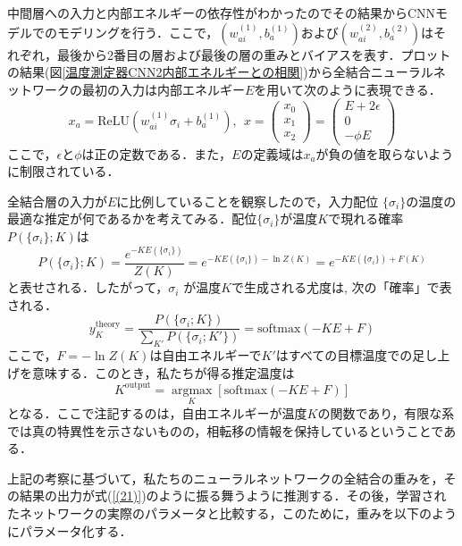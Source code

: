 \documentclass[a4paper,11pt]{jsreport}
\begin{document}
中間層への入力と内部エネルギーの依存性がわかったのでその結果からCNNモデルでのモデリングを行う．ここで，$(w_{ai}^{(1)}, b_a^{(1)})$および$(w_{ai}^{(2)}, b_a^{(2)})$はそれぞれ，最後から2番目の層および最後の層の重みとバイアスを表す．プロットの結果(図\ref{温度測定器CNN2内部エネルギーとの相関})から全結合ニューラルネットワークの最初の入力は内部エネルギー$E$を用いて次のように表現できる．
\begin{equation}
  x_a = \text{ReLU}(w_{ai}^{(1)}\sigma_i + b_a^{(1)}), \ \
  x = \begin{pmatrix} x_0 \\ x_1 \\ x_2 \end{pmatrix}
  = \begin{pmatrix} E+2\epsilon \\ 0 \\ -\phi E \end{pmatrix}
  \label{(19)}
\end{equation}
ここで，$\epsilon$と$\phi$は正の定数である．また，$E$の定義域は$x_a$が負の値を取らないように制限されている．\par
全結合層の入力が$E$に比例していることを観察したので，入力配位 $\{\sigma_i\}$の温度の最適な推定が何であるかを考えてみる．配位$\{ \sigma_i \}$が温度$K$で現れる確率$P(\{ \sigma_i \} ; K )$は
\begin{equation}
  P(\{ \sigma_i \} ; K )
  = \frac{e^{-KE(\{ \sigma_i \})}}{Z(K)}
  = e^{-KE(\{ \sigma_i \}) - \ln{Z(K)}}
  = e^{-KE(\{ \sigma_i \}) + F(K)}
\end{equation}
と表せされる．したがって，${\sigma_i}$ が温度$K$で生成される尤度は,
次の「確率」で表される．
\begin{equation}
  y_K^{\text{theory}} = \frac{P(\{\sigma_i ; K \})}{\sum_{K'}P(\{\sigma_i ; K' \})} = \text{softmax}(-KE + F) \label{(21)}
\end{equation}
ここで，$F = -\ln{Z(K)}$は自由エネルギーで$K'$はすべての目標温度での足し上げを意味する．このとき，私たちが得る推定温度は
\begin{equation}
  K^{\text{output}} =
  \underset{K} {\operatorname{argmax}} \left[\text{softmax}(-KE + F)\right]
\end{equation}
となる．ここで注記するのは，自由エネルギーが温度$K$の関数であり，有限な系では真の特異性を示さないものの，相転移の情報を保持しているということである．\par
上記の考察に基づいて，私たちのニューラルネットワークの全結合の重みを，その結果の出力が式(\ref{(21)})のように振る舞うように推測する．その後，学習されたネットワークの実際のパラメータと比較する，このために，重みを以下のようにパラメータ化する．
\end{document}
